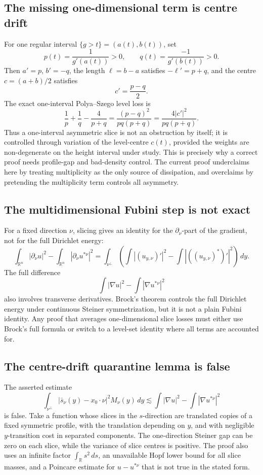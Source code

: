 \documentclass[11pt]{article}
\theoremstyle{definition}
\newcommand{\R}{\mathbb R}
\begin{document}
\subsection{The missing one-dimensional term is centre drift}

For one regular interval \(\{g>t\}=(a(t),b(t))\), set
\[
   p(t)=\frac{1}{g'(a(t))}>0,\qquad
   q(t)=\frac{-1}{g'(b(t))}>0.
\]
Then \(a'=p\), \(b'=-q\), the length \(\ell=b-a\) satisfies
\(-\ell'=p+q\), and the centre \(c=(a+b)/2\) satisfies
\[
   c'=\frac{p-q}{2}.
\]
The exact one-interval Polya--Szego level loss is
\begin{equation}\label{eq:one-interval-loss}
   \frac1p+\frac1q-\frac{4}{p+q}
   =
   \frac{(p-q)^2}{pq(p+q)}
   =
   \frac{4|c'|^2}{pq(p+q)}.
\end{equation}
Thus a one-interval asymmetric slice is not an obstruction by itself; it
is controlled through variation of the level-centre \(c(t)\), provided
the weights are non-degenerate on the height interval under study.  This
is precisely why a correct proof needs profile-gap and bad-density
control.  The current proof underclaims here by treating multiplicity as
the only source of dissipation, and overclaims by pretending the
multiplicity term controls all asymmetry.

\subsection{The multidimensional Fubini step is not exact}

For a fixed direction \(\nu\), slicing gives an identity for the
\(\partial_\nu\)-part of the gradient, not for the full Dirichlet energy:
\[
   \int_{\R^n}|\partial_\nu u|^2-\int_{\R^n}|\partial_\nu u^{*\nu}|^2
   =
   \int_{\nu^\perp}
   \left(\int |(u_{y,\nu})'|^2-\int |((u_{y,\nu})^*)'|^2\right)\,dy.
\]
The full difference
\[
   \int|\nabla u|^2-\int|\nabla u^{*\nu}|^2
\]
also involves transverse derivatives.  Brock's theorem controls the full
Dirichlet energy under continuous Steiner symmetrization, but it is not a
plain Fubini identity.  Any proof that averages one-dimensional slice
losses must either use Brock's full formula or switch to a level-set
identity where all terms are accounted for.

\subsection{The centre-drift quarantine lemma is false}

The asserted estimate
\[
   \int_{\nu^\perp} |\bar s_\nu(y)-x_0\cdot\nu|^2M_\nu(y)\,dy
   \lesssim
   \int|\nabla u|^2-\int|\nabla u^{*\nu}|^2
\]
is false.  Take a function whose slices in the \(s\)-direction are
translated copies of a fixed symmetric profile, with the translation
depending on \(y\), and with negligible \(y\)-transition cost in separated
components.  The one-direction Steiner gap can be zero on each slice,
while the variance of slice centres is positive.  The proof also uses an
infinite factor \(\int_\R s^2\,ds\), an unavailable Hopf lower bound for
all slice masses, and a Poincare estimate for \(u-u^{*\nu}\) that is not
true in the stated form.
\end{document}
